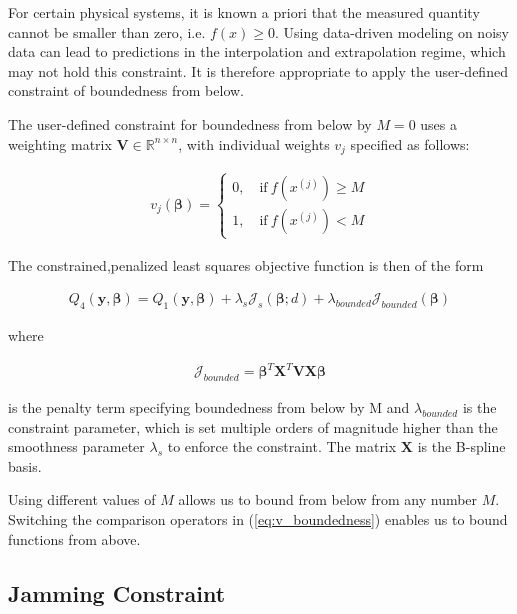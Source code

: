 \documentclass[10pt,a4paper]{article}
\begin{document}
	For certain physical systems, it is known a priori that the measured quantity cannot be smaller than zero, i.e. $f(x) \ge 0$. Using data-driven modeling on noisy data can lead to predictions in the interpolation and extrapolation regime, which may not hold this constraint. It is therefore appropriate to apply the user-defined constraint of boundedness from below.
	
	The user-defined constraint for boundedness from below by $M=0$ uses a weighting matrix $\boldsymbol{V} \in \mathbb{R}^{n\times n}$, with individual weights $v_j$ specified as follows:
	
	\begin{align} \label{eq:v_boundedness}
		v_j(\boldsymbol{\beta}) = \begin{cases} 
										0, \quad \text{if} \ f(x^{(j)}) \ge M\\ 
										1, \quad \text{if} \ f(x^{(j)})  < M 		
			  \end{cases}
	\end{align}
	
	The constrained,penalized least squares objective function is then of the form
	
	\begin{align}\label{eq:OF_4}
		Q_4(\boldsymbol{y}, \boldsymbol{\beta}) = Q_1(\boldsymbol{y}, \boldsymbol{\beta}) + \lambda_s \mathcal J_s(\boldsymbol{\beta}; d) + \lambda_{bounded} \mathcal J_{bounded}(\boldsymbol{\beta}) 
	\end{align}
	
	where

	\begin{align}\label{eq:J_bounded}
	 	\mathcal J_{bounded} = \boldsymbol{\beta}^T \boldsymbol{X}^T \boldsymbol{V} \boldsymbol{X} \boldsymbol{\beta} 	
	\end{align}
	
	is the penalty term specifying boundedness from below by M and $\lambda_{bounded}$ is the constraint parameter, which is set multiple orders of magnitude higher than the smoothness parameter $\lambda_s$ to enforce the constraint. The matrix $\boldsymbol{X}$ is the B-spline basis. 
	
	Using different values of $M$ allows us to bound from below from any number $M$. Switching the comparison operators in (\ref{eq:v_boundedness}) enables us to bound functions from above. 
	
	\subsection{Jamming Constraint}
	
\end{document}
